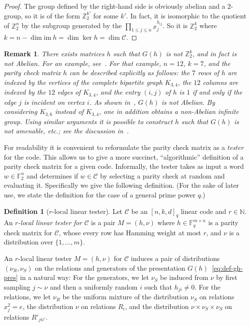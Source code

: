 \documentclass[11pt]{article}
\newtheorem{remark}[theorem]{Remark}
\theoremstyle{definition}
\newtheorem{definition}[theorem]{Definition}
\newcommand{\code}{\mathscr{C}}
\newcommand{\N}{\ensuremath{\mathbb{N}}}
\newcommand{\F}{\ensuremath{\mathbb{F}}}
\newcommand{\Z}{\ensuremath{\mathbb{Z}}}
\begin{document}
\begin{proof}
The group defined by the right-hand side is obviously abelian and a $2$-group, so it is of the form $\Z_2^{k'}$ for some $k'$. In fact, it is isomorphic to the quotient of $\Z_2^n$ by the subgroup generated by the $\prod_{1\leq j \leq n} x_j^{h_{ij}}$. So it is $\Z_2^k$ where $k=n-\dim\textrm{im}\ h = \dim\ker h=\dim \code$.  
\end{proof}

\begin{remark}\label{rk:non-abelian}
There exists matrices $h$ such that $G(h)$ is not $\Z_2^k$, and in fact is not Abelian. For an example, see~\cite[Example 2.16]{paddock2022arkhipov}. For that example, $n=12$, $k=7$, and the parity check matrix $h$ can be described explicitly as follows: the $7$ rows of $h$ are indexed by the vertices of the complete bipartite graph $K_{3,4}$, the $12$ columns are indexed by the $12$ edges of $K_{3,4}$, and the entry $(i,j)$ of $h$ is $1$ if and only if the edge $j$ is incident on vertex $i$. As shown in~\cite{paddock2022arkhipov}, $G(h)$ is not Abelian. By considering $K_{3,6}$ instead of $K_{3,4}$, one in addition obtains a non-Abelian \emph{infinite} group. Using similar arguments it is possible to construct $h$ such that $G(h)$ is not amenable, etc.; see the discussion in~\cite[Section 6]{paddock2022arkhipov}.
\end{remark}


For readability it is convenient to reformulate the parity check matrix as a \emph{tester} for the code. This allows us to give a more succinct, ``algorithmic'' definition of a parity check matrix for a given code. Informally, the tester takes as input a word $w\in \F_2^n$ and determines if $w\in \code$ by selecting a parity check at random and evaluating it. 
 Specifically we give the following definition. (For the sake of later use, we state the definition for the case of a general prime power $q$.)

\begin{definition}[$r$-local linear tester]\label{def:code-test}
Let $\code$ be an $[n,k,d]_q$ linear code and $r\in \N$.
An \emph{$r$-local linear tester for $\code$} is a pair $M = (h,\nu)$ where $h \in \F_q^{m \times n}$ is a parity check matrix for $\code$, whose every row has Hamming weight at most $r$, and $\nu$ is a distribution over $\{1,\ldots,m\}$. 
\end{definition}

An $r$-local linear tester $M=(h,\nu)$ for $\code$ induces a pair of distributions $(\nu_R,\nu_S)$ on the relations and generators of the presentation $G(h)$~\eqref{eq:def-gh-pres} in a natural way: For the generators, we let $\nu_S$ be induced from $\nu$ by first sampling $j\sim \nu$ and then a uniformly random $i$ such that $h_{ji}\neq 0$. For the relations, we let $\nu_R$ be the uniform mixture of the distribution $\nu_S$ on relations $x_j^2=e$, the distribution $\nu$ on relations $R_i$, and the distribution $\nu\times \nu_S\times \nu_S$ on relations $R'_{jii'}$.
\end{document}
